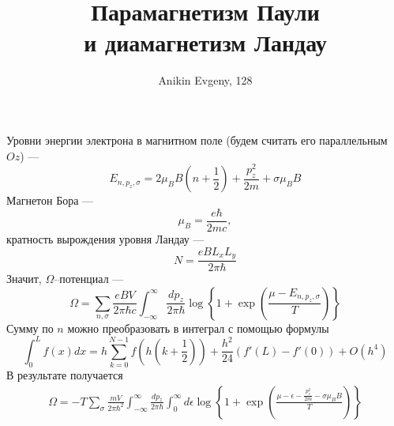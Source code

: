 \documentclass{article}
\title{Парамагнетизм Паули \\и диамагнетизм Ландау}
\author{Anikin Evgeny, 128}
\begin{document}
\maketitle
Уровни энергии электрона в магнитном поле (будем считать его параллельным $Oz$) ---
\begin{equation}
    E_{n,p_z,\sigma} = 2\mu_B B \left(n + \frac{1}{2}\right) + 
                       \frac{p_z^2}{2m} + \sigma \mu_B B
\end{equation}
Магнетон Бора ---
\begin{equation}
    \mu_B = \frac{e\hbar}{2mc},
\end{equation}
кратность вырождения уровня Ландау ---
\begin{equation}
    N = \frac{eBL_xL_y}{2\pi\hbar}
\end{equation}
Значит, $\Omega$--потенциал --- 
\begin{equation}
    \Omega = \sum_{n,\sigma} \frac{eBV}{2\pi\hbar c} 
                \int_{-\infty}^{\infty} \frac{dp_z}{2\pi\hbar}
                \log{\left\{1 + \exp{\left(\frac{\mu - E_{n,p_z,\sigma}}{T}\right)}\right\}}
\end{equation}
Сумму по $n$ можно преобразовать в интеграл с помощью формулы
\begin{equation}
    \int_0^L f(x) dx = h\sum_{k=0}^{N-1} f(h(k+{\textstyle \frac12}))
                       +{\textstyle\frac{h^2}{24}} \left(f'(L) - f'(0)\right) + O(h^4)
\end{equation}
В результате получается
\begin{multline}
    \Omega = -T\sum_\sigma\frac{mV}{2\pi\hbar^2} \int_{-\infty}^{\infty} 
                    \frac{dp_z}{2\pi\hbar}\int_0^\infty d\epsilon 
                           \log{\left\{1 + \exp{\left(\frac{\mu - \epsilon - 
                                \frac{p_z^2}{2m}-\sigma\mu_B B}{T} \right)} \right\}}
\end{multline}
\end{document}
